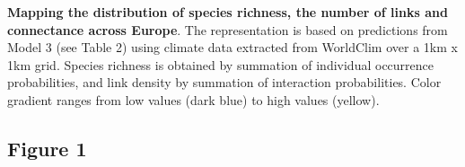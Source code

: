 \documentclass[12pt]{article}
\begin{document}
\textbf{Mapping the distribution of species richness, the number of links and
connectance across Europe}. The representation is based on predictions from
Model 3 (see Table 2) using climate data extracted from WorldClim over a 1km x
1km grid. Species richness is obtained by summation of individual occurrence
probabilities, and link density by summation of interaction probabilities.
Color gradient ranges from low values (dark blue) to high values (yellow).

\newpage

\subsection*{Figure 1}

\begin{figure}[ht!]

\end{figure}
\end{document}
